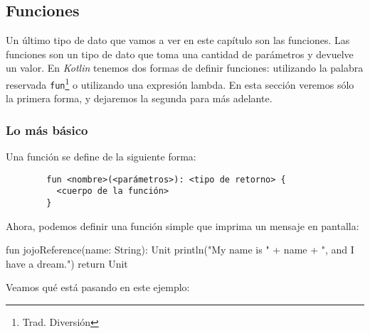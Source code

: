   \subsection{Funciones}
    Un último tipo de dato que vamos a ver en este capítulo son las funciones.
    Las funciones son un tipo de dato que toma una cantidad de parámetros y devuelve un valor.
    En \textit{Kotlin} tenemos dos formas de definir funciones: utilizando la palabra reservada
    \texttt{fun}\footnote{Trad. Diversión} o utilizando una expresión lambda.
    En esta sección veremos sólo la primera forma, y dejaremos la segunda para más adelante.
    
    \subsubsection{Lo más básico}
      Una función se define de la siguiente forma:

      \begin{verbatim}
        fun <nombre>(<parámetros>): <tipo de retorno> {
          <cuerpo de la función>
        }
      \end{verbatim}

      Ahora, podemos definir una función simple que imprima un mensaje en pantalla:

      \begin{kotlin}
        fun jojoReference(name: String): Unit {
          println("My name is " + name + ", and I have a dream.")
          return Unit
        }
      \end{kotlin}
      
      Veamos qué está pasando en este ejemplo:

